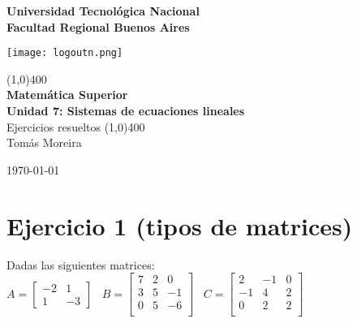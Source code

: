 \documentclass[11pt]{article}
\begin{document}
		
	\begin{titlepage}
		\begin{center}
			\vspace*{0.5cm}
			\Large{\textbf{Universidad Tecnológica Nacional}}\\
			\Large{\textbf{Facultad Regional Buenos Aires}}\\
			\begin{center}
				\texttt{[image: logoutn.png]}
			\end{center}
			\vfill
			\line(1,0){400}\\
			\vspace*{0.3cm}
			\huge{\textbf{Matemática Superior}}\\
			\Large{\textbf{Unidad 7: Sistemas de ecuaciones lineales}}\\
			\large{Ejercicios resueltos}
			\line(1,0){400}\\
			\vfill
			Tomás Moreira \\
			
			
			\today
				
				
		\end{center}
	\end{titlepage}

	\tableofcontents
	\thispagestyle{empty}
	\clearpage

	\setcounter{page}{1}
	
	\section{Ejercicio 1 (tipos de matrices)}
	Dadas las siguientes matrices: $\;\;\;$
	$A=\begin{bmatrix}
		-2 & 1 \\
		1 & -3
	\end{bmatrix} \;\;\;
	B=\begin{bmatrix}
		7 & 2 & 0 \\
		3 & 5 & -1 \\
		0 & 5 & -6 \\
	\end{bmatrix} \;\;\;
	C=\begin{bmatrix}
		2 & -1 & 0 \\
		-1 & 4 & 2 \\
		0 & 2 & 2 \\
	\end{bmatrix}
	$
	
\end{document}
